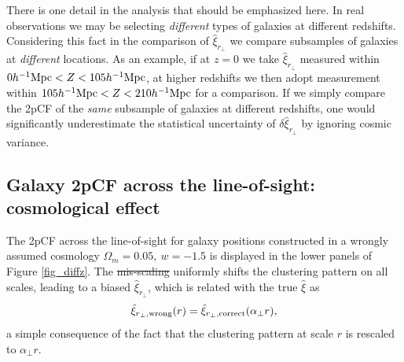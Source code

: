 \documentclass[iop]{emulateapj}
\providecommand{\DIFadd}[1]{{\protect\color{blue}\uwave{#1}}} %
\providecommand{\DIFdel}[1]{{\protect\color{red}\sout{#1}}}                      %
\providecommand{\DIFaddbegin}{} %
\providecommand{\DIFaddend}{} %
\providecommand{\DIFdelbegin}{} %
\providecommand{\DIFdelend}{} %
\begin{document}
There is one detail in the analysis that should be emphasized here.
In real observations we may be selecting {\it different} types of galaxies at different redshifts.
Considering this fact in the comparison of $\hat\xi_{r_\perp}$ 
we compare subsamples of galaxies at {\it different} locations.
As an example, if at $z=0$ we take $\hat\xi_{r_\perp}$ measured within $0h^{-1}{\rm Mpc}<Z<105 h^{-1}{\rm Mpc}$,
at higher redshifts we then adopt measurement within $105h^{-1}{\rm Mpc}<Z<210 h^{-1}{\rm Mpc}$ for a comparison.
If we simply compare the 2pCF of the {\it same} subsample of galaxies at different redshifts, 
one would significantly underestimate the statistical uncertainty of $\delta \hat{\xi}_{r_\perp}$ by ignoring cosmic variance.




\subsection{Galaxy 2pCF across the line-of-sight: cosmological effect }

The 2pCF across the line-of-sight for galaxy positions constructed in a wrongly assumed cosmology $\Omega_m=0.05,\ w=-1.5$
is displayed in the lower panels of Figure \ref{fig_diffz}.
The \DIFdelbegin \DIFdel{mis-scaling }\DIFdelend \DIFaddbegin \DIFadd{scaling }\DIFaddend uniformly shifts the clustering pattern on all scales, 
leading to a biased $\hat \xi_{r_\perp}$, which is 
related with the true $\hat \xi$ as
\begin{equation}
 \hat \xi_{r_\perp,\rm wrong}(r) = \hat \xi_{r_\perp, \rm correct}(\alpha_{\perp} r),
\end{equation}
a simple consequence of the fact that the clustering pattern at scale $r$ is rescaled to $\alpha_{\perp} r$.
\end{document}
